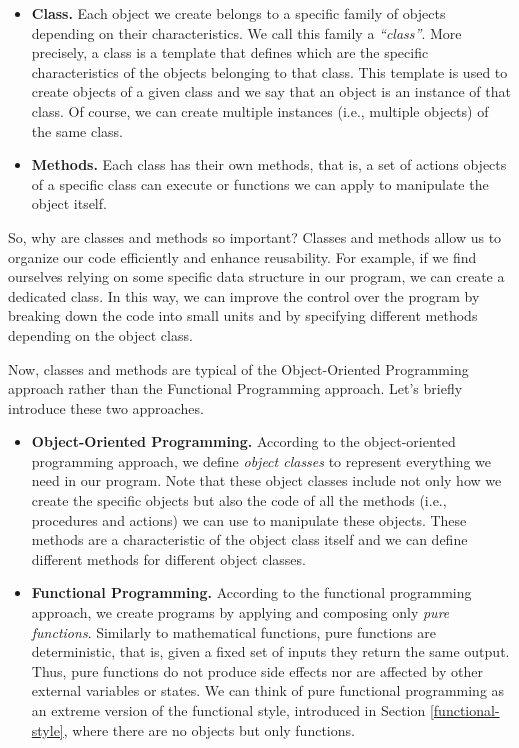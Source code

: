 \documentclass[
  11pt,
]{book}
\providecommand{\tightlist}{%
  \setlength{\itemsep}{0pt}\setlength{\parskip}{0pt}}
\begin{document}
\begin{itemize}
\item
  \textbf{Class.} Each object we create belongs to a specific family of objects depending on their characteristics. We call this family a \emph{``class''}. More precisely, a class is a template that defines which are the specific characteristics of the objects belonging to that class. This template is used to create objects of a given class and we say that an object is an instance of that class. Of course, we can create multiple instances (i.e., multiple objects) of the same class.
\item
  \textbf{Methods.} Each class has their own methods, that is, a set of actions objects of a specific class can execute or functions we can apply to manipulate the object itself.
\end{itemize}

So, why are classes and methods so important? Classes and methods allow us to organize our code efficiently and enhance reusability. For example, if we find ourselves relying on some specific data structure in our program, we can create a dedicated class. In this way, we can improve the control over the program by breaking down the code into small units and by specifying different methods depending on the object class.

Now, classes and methods are typical of the Object-Oriented Programming approach rather than the Functional Programming approach. Let's briefly introduce these two approaches.

\begin{itemize}
\tightlist
\item
  \textbf{Object-Oriented Programming.} According to the object-oriented programming approach, we define \emph{object classes} to represent everything we need in our program. Note that these object classes include not only how we create the specific objects but also the code of all the methods (i.e., procedures and actions) we can use to manipulate these objects. These methods are a characteristic of the object class itself and we can define different methods for different object classes.
\item
  \textbf{Functional Programming.} According to the functional programming approach, we create programs by applying and composing only \emph{pure functions}. Similarly to mathematical functions, pure functions are deterministic, that is, given a fixed set of inputs they return the same output. Thus, pure functions do not produce side effects nor are affected by other external variables or states. We can think of pure functional programming as an extreme version of the functional style, introduced in Section \ref{functional-style}, where there are no objects but only functions.
\end{itemize}
\end{document}
